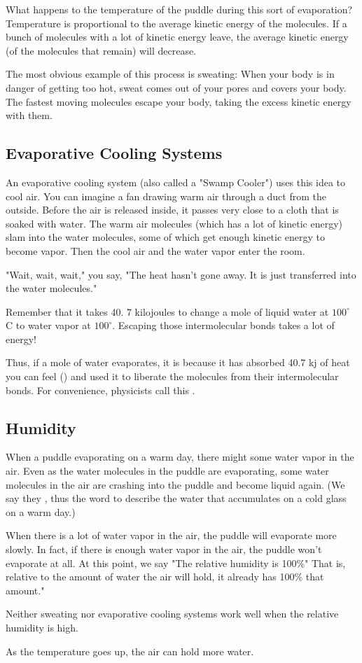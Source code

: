 What happens to the temperature of the puddle during this sort of evaporation?  Temperature is proportional to the average kinetic energy of the molecules.  If a bunch of molecules with a lot of kinetic energy leave,  the average kinetic energy (of the molecules that remain) will decrease.

The most obvious example of this process is sweating:  When your body is in danger of getting too hot,  sweat comes out of your pores and covers your body.   The fastest moving molecules escape your body,  taking the excess kinetic energy with them.

\subsection{Evaporative Cooling Systems}

An evaporative cooling system (also called a "Swamp Cooler") uses this idea to cool air.  You can imagine a fan drawing warm air through a duct from the outside.   Before the air is released inside,  it passes very close to a cloth that is soaked with water.   The warm air molecules (which has a lot of kinetic energy) slam into the water molecules,  some of which get enough kinetic energy to become vapor.  Then the cool air and the water vapor enter the room.

"Wait, wait, wait," you say, "The heat hasn't gone away.  It is just transferred into the water molecules."

Remember that it takes 40. 7 kilojoules to change a mole of liquid water at $100^\circ$ C to water vapor at $100^\circ$.  Escaping those intermolecular bonds takes a lot of energy!

Thus,   if a mole of water evaporates,   it is because it has absorbed 40.7 kj of heat you can feel
 () and used it to liberate the molecules from their intermolecular bonds.  For
 convenience,  physicists call this .
 
 \subsection{Humidity}
 
When a puddle evaporating on a warm day,  there might some water vapor in the air.  Even as the water molecules in the puddle are evaporating,  some water molecules in the air are crashing into the puddle and become liquid again.  (We say they ,  thus the word  to describe the water that accumulates on a cold glass on a warm day.)
 
When there is a lot of water vapor in the air,  the puddle will evaporate more slowly.   In fact,  if there is enough
water vapor in the air,  the puddle won't evaporate at all.   At this point,  we say "The relative humidity is 100\%"   That is, relative to the amount of water the air will hold,  it already has 100\% that amount."

Neither sweating nor evaporative cooling systems work well when the relative humidity is high.

As the temperature goes up,  the air can hold more water.

 